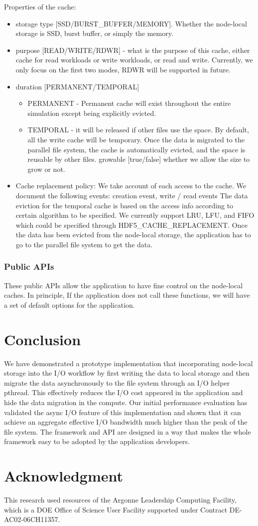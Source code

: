 \documentclass[aps, rmp, 11pt, notitlepage]{revtex4-1}
\begin{document}
Properties of the cache:
\begin{itemize}
\item storage type [SSD/BURST\_BUFFER/MEMORY]. Whether the node-local storage is SSD, burst buffer, or simply the memory.
\item purpose [READ/WRITE/RDWR] - what is the purpose of this cache, either cache for read workloads or write workloads, or read and write. Currently, we only focus on the first two modes, RDWR will be supported in future.
\item duration [PERMANENT/TEMPORAL]
\begin{itemize}
\item PERMANENT - Permanent cache will exist throughout the entire simulation except being explicitly evicted.
\item TEMPORAL - it will be released if other files use the space. By default, all the write cache will be temporary. Once the data is migrated to the parallel file system, the cache is automatically evicted, and the space is reusable by other files.
growable [true/false] whether we allow the size to grow or not.
\end{itemize}
\item Cache replacement policy: 
We take account of each access to the cache.
We document the following events: creation event, write / read events
The data eviction for the temporal cache is based on the access info according to certain algorithm to be specified. We currently support LRU, LFU, and FIFO which could be specified through HDF5\_CACHE\_REPLACEMENT.
Once the data has been evicted from the node-local storage, the application has to go to the parallel file system to get the data.
\end{itemize}

\subsubsection{Public APIs}
These public APIs allow the application to have fine control on the node-local caches. In principle, If the application does not call these functions, we will have a set of default options for the application.

\section{Conclusion}
We have demonstrated a prototype implementation that incorporating node-local storage into the I/O workflow by first writing the data to local storage and then migrate the data asynchronously to the file system through an I/O helper pthread. This effectively reduces the I/O cost appeared in the application and hide the data migration in the compute. Our initial performance evaluation has validated the async I/O feature of this implementation and shown that it can achieve an aggregate effective I/O bandwidth much higher than the peak of the file system. The framework and API are designed in a way that makes the whole framework easy to be adopted by the application developers. 
\section*{Acknowledgment}
This research used resources of the Argonne Leadership Computing Facility, which is a DOE Office of Science User Facility supported under Contract DE-AC02-06CH11357.
\end{document}
